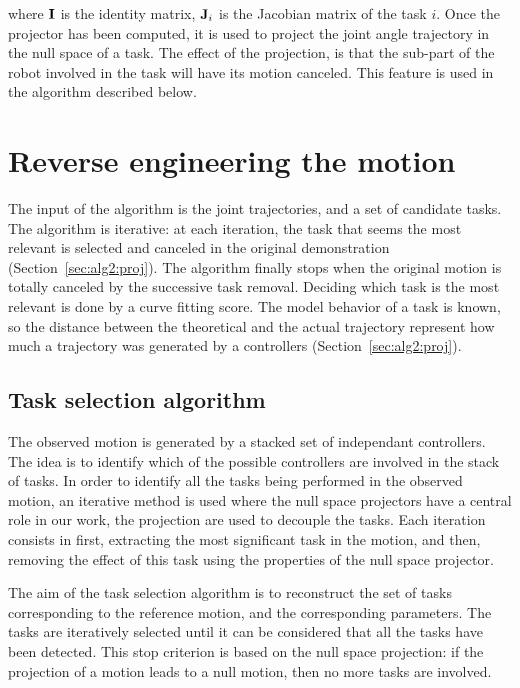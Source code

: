 \documentclass[letterpaper, 10pt, conference]{ieeeconf}      %
\begin{document}
\noindent where ${\mathbf{I}}$ is the identity matrix, ${\mathbf{J}}_i$ is the Jacobian matrix
of the task $i$. Once the projector has been computed, it is used to project
the joint angle trajectory in the null space of a task. The effect of
the projection, is that the sub-part of the robot involved in the task will have
its motion canceled. This feature is used in the algorithm described below.

\section{Reverse engineering the motion} \label{sec:detect}

The input of the algorithm is the joint trajectories, and a set of candidate
tasks. The algorithm is iterative: at each iteration, the task that seems the
most relevant is selected and canceled in the original demonstration (Section~\ref{sec:alg2:proj}).
The algorithm finally stops when the original
motion is totally canceled by the successive task removal. Deciding which
task is the most relevant is done by a curve fitting score. 
The model behavior of a task is known, so the distance between
the theoretical and the actual trajectory represent how much a trajectory
was generated by a controllers (Section~\ref{sec:alg2:proj}).

\subsection{Task selection algorithm} \label{sec:alg1:selec}
The observed motion is generated by a stacked set of independant
controllers.  The idea is to identify which of the possible controllers are
involved in the stack of tasks. 
In order to identify all the
tasks being performed in the observed motion, an iterative method is used where
the null space projectors have a central role in our work, the projection
are used to decouple the tasks.
Each iteration consists in first, extracting the most significant task in the motion,
and then, removing the effect of this task using the properties of the null space projector.

The aim of the task selection algorithm is to reconstruct the set of tasks corresponding
to the reference motion, and the corresponding parameters.
The tasks are iteratively selected until it can be considered that all the tasks
have been detected.
This stop criterion is based on the
null space projection: if the projection of a motion
leads to a null motion, then no more tasks are involved.
\end{document}

